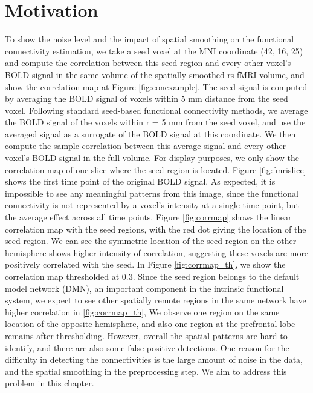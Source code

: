 \section{Motivation}
To show the noise level and the impact of spatial smoothing on the functional
connectivity estimation, we take a seed voxel at the MNI coordinate (42, 16, 25)
and compute the correlation between this seed region and every other voxel's
BOLD signal in the same volume of the spatially smoothed rs-fMRI volume, and
show the correlation map at Figure \ref{fig:conexample}. The seed signal is
computed by averaging the BOLD signal of voxels within 5 mm distance from the
seed voxel. Following  standard seed-based functional connectivity methods,
we average the BOLD signal of the voxels within r = 5 mm from the seed voxel,
and use the averaged signal as a surrogate of the BOLD signal at this
coordinate. We then compute the sample correlation between this average signal
and every other voxel's BOLD signal in the full volume. For display purposes, we
only show the correlation map of one slice where the seed region is
located. Figure \ref{fig:fmrislice} shows the first time point of the original
BOLD signal. As expected, it is impossible to see any meaningful patterns from
this image, since the functional connectivity is not represented by a voxel's
intensity at a single time point, but the average effect across all time
points. Figure \ref{fig:corrmap} shows the linear correlation map with the seed
regions, with the red dot giving the location of the seed region. We can see the
symmetric location of the seed region on the other hemisphere shows higher
intensity of correlation, suggesting these voxels are more positively correlated
with the seed. In Figure \ref{fig:corrmap_th}, we show the correlation map
thresholded at 0.3. Since the seed region belongs to the default model network
(DMN), an important component in the intrinsic functional system, we expect to
see other spatially remote regions in the same network have higher correlation
in \ref{fig:corrmap_th}, We observe one region on the same location of the
opposite hemisphere, and also one region at the prefrontal lobe remains after
thresholding. However, overall the spatial patterns are hard to identify, and there
are also some false-positive detections. One reason for the difficulty in
detecting the connectivities is the large amount of noise in the data, and the
spatial smoothing in the preprocessing step. We aim to address this problem in
this chapter.


